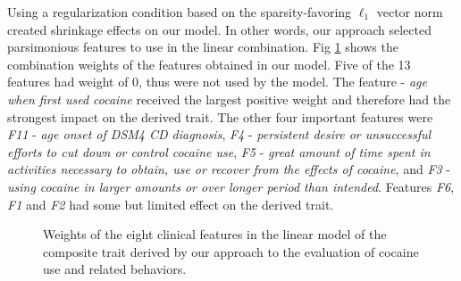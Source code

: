 \documentclass[10pt,letterpaper]{article}
\begin{document}
Using a regularization condition based on the sparsity-favoring $\ell_1$ vector norm created shrinkage effects on our model. In other words, our approach selected parsimonious features to use in the linear combination.  Fig \ref{fig:coc_weights_bar_plot} shows the combination weights of the features obtained in our model. Five of the 13 features had weight of 0, thus were not used by the model. The feature - {\em age when first used cocaine} received the largest positive weight and therefore had the strongest impact on the derived trait. The other four important features were {\em F11} - {\em age onset of DSM4 CD diagnosis}, {\em F4} - {\em persistent desire or unsuccessful efforts to cut down or control cocaine use}, {\em F5} - {\em great amount of time spent in activities necessary to obtain, use or recover from the effects of cocaine}, and {\em F3} - {\em using cocaine in larger amounts or over longer period than intended}. Features {\em F6}, {\em F1} and {\em F2} had some but limited effect on the derived trait. 
\begin{figure}[ht]
	\vskip 0.2in
	\begin{center}
		\caption{Weights of the eight clinical features in the linear model of the composite trait derived by our approach to the evaluation of cocaine use and related behaviors.}
		\label{fig:coc_weights_bar_plot}
	\end{center}
	\vskip -0.2in
\end{figure}

\end{document}

